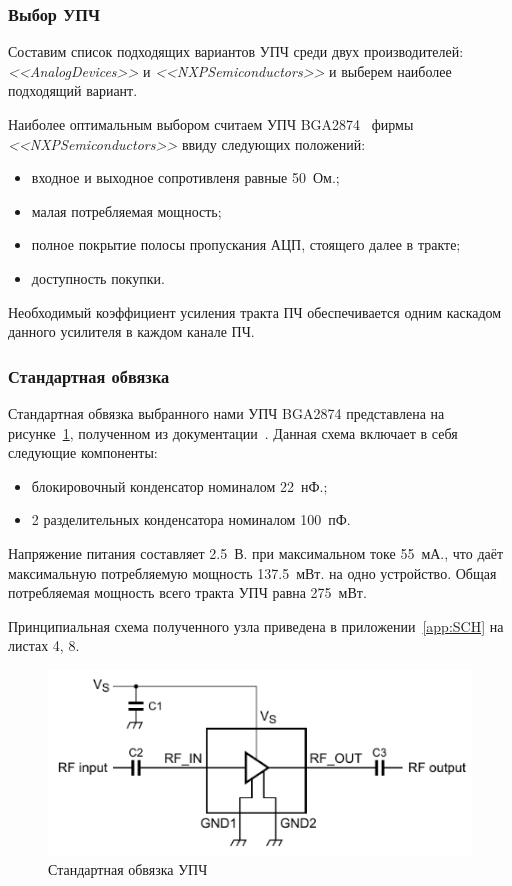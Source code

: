 \documentclass[utf8x, 14pt, oneside, a4paper]{article}
\begin{document}
			\subsubsection{Выбор УПЧ}
				Составим список подходящих вариантов УПЧ среди двух производителей: \textit{<<AnalogDevices>>} и \textit{<<NXPSemiconductors>>} и выберем наиболее подходящий вариант.
				
				
				
				Наиболее оптимальным выбором считаем УПЧ BGA2874~\cite{bib:МШУ} фирмы \textit{<<NXPSemiconductors>>} ввиду следующих положений:
				\begin{itemize}
					\item входное и выходное сопротивленя равные 50~Ом.;
					\item малая потребляемая мощность;
					\item полное покрытие полосы пропускания АЦП, стоящего далее в тракте;
					\item доступность покупки.
				\end{itemize}
				Необходимый коэффициент усиления тракта ПЧ обеспечивается одним каскадом данного усилителя в каждом канале ПЧ.
			
			\subsubsection{Стандартная обвязка}
				Стандартная обвязка выбранного нами УПЧ BGA2874 представлена на рисунке~\ref{fig:обвязка:УПЧ}, полученном из документации~\cite{bib:УПЧ}. Данная схема включает в себя следующие компоненты:
				\begin{itemize}
					\item блокировочный конденсатор номиналом 22~нФ.;
					\item 2 разделительных конденсатора номиналом 100~пФ.
				\end{itemize}
			
				Напряжение питания составляет 2.5~В. при максимальном токе 55~мА., что даёт максимальную потребляемую мощность 137.5~мВт. на одно устройство. Общая потребляемая мощность всего тракта УПЧ равна 275~мВт.
				
				Принципиальная схема полученного узла приведена в приложении~\ref{app:SCH} на листах 4, 8.
				\begin{figure}[h!]
					\centering
					\includegraphics[width=0.7\linewidth]{"Обвязка УПЧ"}
					\caption{Стандартная обвязка УПЧ}
					\label{fig:обвязка:УПЧ}
				\end{figure}
			
\end{document}
